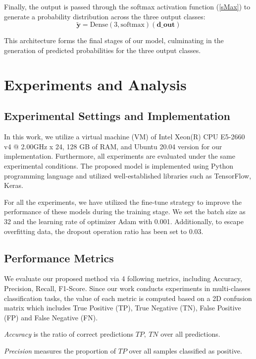 Finally, the output is passed through the softmax activation function (\ref{sMax}) to generate a probability distribution across the three output classes:
\begin{equation}
    \mathbf{\widetilde{y}} = \mathrm{Dense}(3, \mathrm{softmax})(\mathbf{d\_out}) \label{sMax}
\end{equation}

This architecture forms the final stages of our model, culminating in the generation of predicted probabilities for the three output classes. 

\section{Experiments and Analysis} \label{experiments}

\subsection{Experimental Settings and Implementation}
In this work, we utilize a virtual machine (VM) of Intel Xeon(R) CPU E5-2660 v4 @ 2.00GHz x 24, 128 GB of RAM, and Ubuntu 20.04 version for our implementation. Furthermore, all experiments are evaluated under the same experimental conditions. The proposed model is implemented using Python programming language and utilized well-established libraries such as TensorFlow, Keras.

For all the experiments, we have utilized the fine-tune strategy to improve the performance of these models during the training stage. We set the batch size as 32 and the learning rate of optimizer Adam with 0.001. Additionally, to escape overfitting data, the dropout operation ratio has been set to 0.03.

\subsection{Performance Metrics}

We evaluate our proposed method via 4 following metrics, including Accuracy, Precision, Recall, F1-Score. Since our work conducts experiments in multi-classes classification tasks, the value of each metric is computed based on a 2D confusion matrix which includes True Positive (TP), True Negative (TN), False Positive (FP) and False Negative (FN).

\textit{Accuracy} is the ratio of correct predictions $TP,~TN$ over all predictions. 

\textit{Precision} measures the proportion of $TP$ over all samples classified as positive. 


